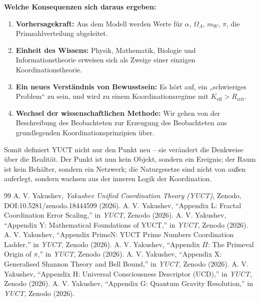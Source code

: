 \documentclass[12pt,a4paper]{article}
\newcommand{\Keff}{K_{\mathrm{eff}}}
\newcommand{\Rcrit}{R_{\mathrm{crit}}}
\begin{document}
	\medskip
	\textbf{Welche Konsequenzen sich daraus ergeben:}
	\begin{enumerate}
		\item \textbf{Vorhersagekraft:} Aus dem Modell werden Werte für \(\alpha\), \(\Omega_\Lambda\), \(m_W\), \(\pi\), die Primzahlverteilung abgeleitet.
		\item \textbf{Einheit des Wissens:} Physik, Mathematik, Biologie und Informationstheorie erweisen sich als Zweige einer einzigen Koordinationstheorie.
		\item \textbf{Ein neues Verständnis von Bewusstsein:} Es hört auf, ein „schwieriges Problem“ zu sein, und wird zu einem Koordinationsregime mit \(\Keff > \Rcrit\).
		\item \textbf{Wechsel der wissenschaftlichen Methode:} Wir gehen von der Beschreibung des Beobachteten zur Erzeugung des Beobachteten aus grundlegenden Koordinationsprinzipien über.
	\end{enumerate}
	
	\medskip
	Somit definiert YUCT nicht nur den Punkt neu – sie verändert die Denkweise über die Realität. Der Punkt ist nun kein Objekt, sondern ein Ereignis; der Raum ist kein Behälter, sondern ein Netzwerk; die Naturgesetze sind nicht von außen auferlegt, sondern wachsen aus der inneren Logik der Koordination.
	
	\begin{thebibliography}{99}
		 A. V. Yakushev, \emph{Yakushev Unified Coordination Theory (YUCT)}, Zenodo, DOI:10.5281/zenodo.18444599 (2026).
		 A. V. Yakushev, ``Appendix L: Fractal Coordination Error Scaling,'' in \emph{YUCT}, Zenodo (2026).
		 A. V. Yakushev, ``Appendix Y: Mathematical Foundations of YUCT,'' in \emph{YUCT}, Zenodo (2026).
		 A. V. Yakushev, ``Appendix PrimeN: YUCT Prime Numbers Coordination Ladder,'' in \emph{YUCT}, Zenodo (2026).
		 A. V. Yakushev, ``Appendix \(\Pi\): The Primeval Origin of \(\pi\),'' in \emph{YUCT}, Zenodo (2026).
		 A. V. Yakushev, ``Appendix X: Generalised Shannon Theory and Bell Bound,'' in \emph{YUCT}, Zenodo (2026).
		 A. V. Yakushev, ``Appendix H: Universal Consciousness Descriptor (UCD),'' in \emph{YUCT}, Zenodo (2026).
		 A. V. Yakushev, ``Appendix G: Quantum Gravity Resolution,'' in \emph{YUCT}, Zenodo (2026).
	\end{thebibliography}
	
\end{document}
